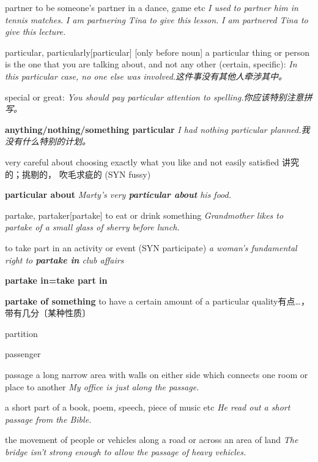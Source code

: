 \begin{DefWord}{partner}
    to be someone's partner in a dance, game etc
    \textit{I used to partner him in tennis matches.}
    \textit{I am partnering Tina to give this lesson.}
    \textit{I am partnered Tina to give this lecture.}
\end{DefWord}

\begin{DefWord}{particular, particularly}[particular]
    [only before noun] a particular thing or person is the one that you are talking about, and not any other (certain, specific):
    \textit{In this particular case, no one else was involved.这件事没有其他人牵涉其中。 }

    special or great:
    \textit{You should pay particular attention to spelling.你应该特别注意拼写。 }
    
    \textbf{anything/nothing/something particular}
    \textit{I had nothing particular planned.我没有什么特别的计划。 }

    very careful about choosing exactly what you like and not easily satisfied 讲究的；挑剔的， 吹毛求疵的 (SYN  fussy)
    
    \textbf{particular about}
    \textit{Marty's very \textbf{particular about} his food.}

\end{DefWord}

\begin{DefWord}{partake, partaker}[partake]
    to eat or drink something
    \textit{Grandmother likes to partake of a small glass of sherry before lunch.}

    to take part in an activity or event
    (SYN  participate)
    \textit{a woman's fundamental right to \textbf{partake in} club affairs}

    \textbf{partake in=take part in}

    \textbf{partake of something} 
    to have a certain amount of a particular quality有点…， 带有几分〔某种性质〕
\end{DefWord}

\begin{DefWord}{partition}
\end{DefWord}

\begin{DefWord}{passenger}
\end{DefWord}

\begin{DefWord}{passage}
    a long narrow area with walls on either side which connects one room or place to another
    \textit{My office is just along the passage.}

    a short part of a book, poem, speech, piece of music etc
    \textit{He read out a short passage from the Bible.}

    the movement of people or vehicles along a road or across an area of land
    \textit{The bridge isn't strong enough to allow the passage of heavy vehicles.}
\end{DefWord}

